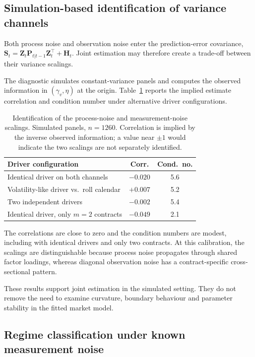 \documentclass[journal]{IEEEtran}
\begin{document}
\subsection{Simulation-based identification of variance channels}
\label{sec:varid}

Both process noise and observation noise enter the prediction-error covariance, $\bm{S}_t=\bm{Z}_t\bm{P}_{t|t-1}\bm{Z}_t^{\!\top}+\bm{H}_t$. Joint estimation may therefore create a trade-off between their variance scalings.

The diagnostic simulates constant-variance panels and computes the observed information in $(\gamma_v,\eta)$ at the origin. Table~\ref{tab:varid} reports the implied estimate correlation and condition number under alternative driver configurations.
\begin{table}[H]
\centering
\caption{Identification of the process-noise and measurement-noise scalings. Simulated panels, $n = 1260$. Correlation is implied by the inverse observed information; a value near $\pm 1$ would indicate the two scalings are not separately identified.}
\label{tab:varid}
\small
\renewcommand{\arraystretch}{1.2}
\begin{tabular}{@{}lcc@{}}
\toprule
\textbf{Driver configuration} & \textbf{Corr.} & \textbf{Cond.\ no.} \\
\midrule
Identical driver on both channels & $-0.020$ & 5.6 \\
Volatility-like driver vs.\ roll calendar & $+0.007$ & 5.2 \\
Two independent drivers & $-0.002$ & 5.4 \\
\midrule
Identical driver, only $m = 2$ contracts & $-0.049$ & 2.1 \\
\bottomrule
\end{tabular}
\end{table}

The correlations are close to zero and the condition numbers are modest, including with identical drivers and only two contracts. At this calibration, the scalings are distinguishable because process noise propagates through shared factor loadings, whereas diagonal observation noise has a contract-specific cross-sectional pattern.

These results support joint estimation in the simulated setting. They do not remove the need to examine curvature, boundary behaviour and parameter stability in the fitted market model.

\subsection{Regime classification under known measurement noise}
\label{sec:denoise}
\end{document}
